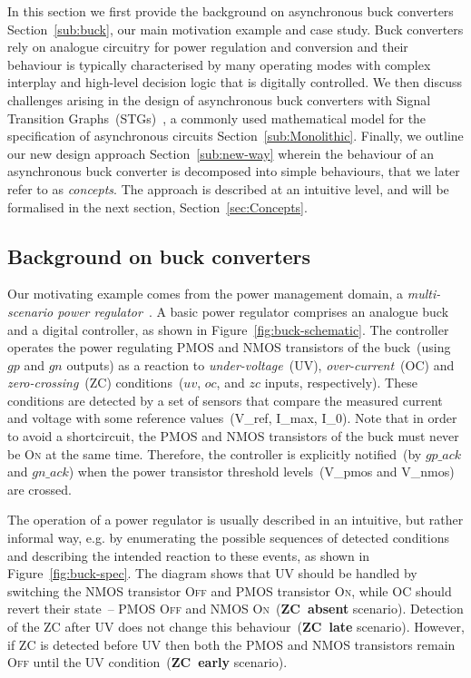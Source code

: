 \documentclass[british, journal]{IEEEtran}
\newcommand{\noun}[1]{\textsc{#1}}
\begin{document}
In this section we first provide the background on asynchronous buck
converters Section~\ref{sub:buck}, our main motivation example and case study.
Buck converters rely on analogue circuitry for power regulation and
conversion and their behaviour is typically characterised by many operating
modes with complex interplay and high-level decision logic that is digitally
controlled.
We then discuss challenges arising in the design of asynchronous buck converters
with Signal Transition Graphs~(STGs)~\cite{Chu_1987_phd}\cite{Rosenblum_1985_tpn},
a commonly used mathematical model for the specification of asynchronous
circuits Section~\ref{sub:Monolithic}.
Finally, we outline our new design approach Section~\ref{sub:new-way} wherein the
behaviour of an asynchronous buck converter is decomposed into simple
behaviours, that we later refer to as \emph{concepts}. The approach is
described at an intuitive level, and will be formalised in the next
section, Section~\ref{sec:Concepts}.

\subsection{Background on buck converters\label{sub:buck}}

Our motivating example comes from the power management domain, a
\emph{multi-scenario power regulator}~\cite{2014_sokolov_ftfc}.
A basic power regulator comprises an analogue buck and a digital controller,
as shown in Figure~\ref{fig:buck-schematic}. The controller operates
the power regulating PMOS and NMOS transistors of the buck~(using \textsf{$gp$}
and \textsf{$gn$} outputs) as a reaction to \emph{under-voltage}~(UV),
\emph{over-current}~(OC) and \emph{zero-crossing}~(ZC) conditions~(\textsf{$uv$},
\textsf{$oc$}, and \textsf{$zc$} inputs, respectively). These conditions
are detected by a set of sensors that compare the measured current and voltage
with some reference values~(\textsf{V\_ref}, \textsf{I\_max}, \textsf{I\_0}).
Note that in order to avoid a shortcircuit, the PMOS and NMOS transistors of
the buck must never be \noun{On} at the same time. Therefore, the controller
is explicitly notified~(by \textsf{$gp\_ack$} and \textsf{$gn\_ack$})
when the power transistor threshold levels~(\textsf{V\_pmos} and \textsf{V\_nmos})
are crossed.

The operation of a power regulator is usually described in an intuitive,
but rather informal way, e.g. by enumerating the possible sequences
of detected conditions and describing the intended reaction to these
events, as shown in Figure~\ref{fig:buck-spec}. The diagram shows
that UV should be handled by switching the NMOS transistor \noun{Off}
and PMOS transistor \noun{On}, while OC should revert their state~--
PMOS \noun{Off} and NMOS \noun{On}~(\textbf{ZC~absent} scenario). Detection of
the ZC after UV does not change this behaviour~(\textbf{ZC~late} scenario).
However, if ZC is detected before UV then both the PMOS and NMOS transistors
remain \noun{Off} until the UV condition~(\textbf{ZC~early} scenario).
\end{document}
